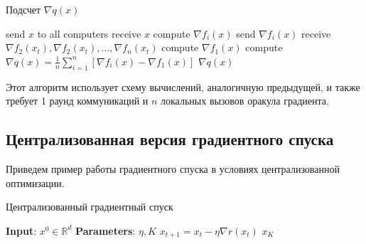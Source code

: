 \documentclass[a4paper,12pt]{extarticle}
\begin{document}
    \begin{algorithm}[]
    \caption{Подсчет $\nabla q(x)$}
    \begin{algorithmic}[1]
    
  
    \STATE{} send $x$ to all computers 
    \vspace{0.5ex}
    \vspace{0.5ex}
    \vspace{0.5ex}
    \STATE{} receive $x$
    \vspace{0.5ex}
    \STATE{} compute $\nabla f_i(x)$
    \vspace{0.5ex}
    \STATE{} send $\nabla f_i(x)$
    \vspace{0.5ex}
    \ENDFOR{}
    \vspace{0.5ex}
    \STATE{} receive $\nabla f_2(x_t), \nabla f_2(x_t), \ldots, \nabla f_n(x_t)$
    \STATE{} compute $\nabla f_1(x)$
    \STATE{} compute $\nabla q(x) = \frac1n \sum_{i = 1}^{n} \left[\nabla f_i(x)  - \nabla f_1(x) \right]$
    \vspace{0.5ex}
    \RETURN{} $\nabla q(x)$
    \end{algorithmic}
    \end{algorithm}

    Этот алгоритм использует схему вычислений, аналогичную предыдущей,
    и также требует 1 раунд коммуникаций и $n$ локальных вызовов оракула градиента. 



\subsection{Централизованная версия градиентного спуска}

Приведем пример работы градиентного спуска в условиях централизованной оптимизации.

\begin{algorithm}[]
    \caption{Централизованный градиентный спуск}
    \begin{algorithmic}[1]

    \STATE{} \textbf{Input}: $x^0 \in \mathbb{R}^d$
    \STATE{} \textbf{Parameters}: $\eta, K$
    \vspace{0.5ex}
    \vspace{0.5ex}
    \STATE{} $x_{t + 1} = x_t - \eta \nabla r(x_t)$
    \vspace{0.5ex}
    \ENDFOR{}
    \RETURN{} $x_{K}$
    \end{algorithmic}
\end{algorithm}
\end{document}

